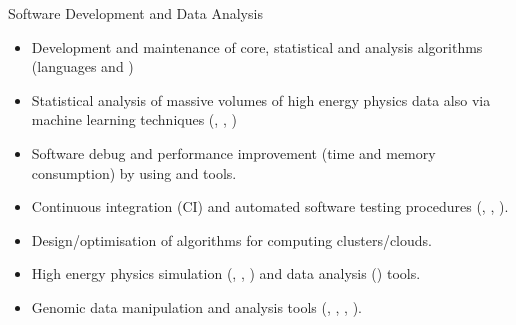\begin{cvskills}
\cvskill
{Software Development and Data Analysis}%
{
\begin{minipage}{0.49\textwidth}
\vspace{0.3em}
\begin{itemize}[labelwidth=\the\widest,align=right,leftmargin=!,labelsep=1pt,noitemsep]
\item[\custItem] Development and maintenance of core, statistical and analysis
algorithms (languages \textsc{\color{awesome}{C/C++}} and 
\textsc{\color{awesome}{Python}})
\item[\custItem] Statistical analysis of massive volumes of high energy physics
data also via machine learning techniques (\textsc{\color{awesome}{TMVA}},
\textsc{\color{awesome}{BDT}}, \textsc{\color{awesome}{TensorFlow}})
\item[\custItem] Software debug and performance improvement (time and memory
consumption) by using \textsc{\color{awesome}{gdb}} and
\textsc{\color{awesome}{Valgrind}} tools.
\end{itemize}
\end{minipage}
\hfill
\begin{minipage}{0.49\textwidth}
\vspace{0.3em}
\begin{itemize}[labelwidth=\the\widest,align=right,leftmargin=!,labelsep=1pt,noitemsep]
\item[\custItem] Continuous integration (CI) and automated software testing procedures
(\textsc{\color{awesome}{Bamboo}}, \textsc{\color{awesome}{Jenkins}},
\textsc{\color{awesome}{Gitlab}}).
\item[\custItem] Design/optimisation of algorithms for computing
clusters/clouds.
\item[\custItem] High energy physics simulation
(\textsc{\color{awesome}{Powheg}}, \textsc{\color{awesome}{Pythia}},
\textsc{\color{awesome}{Madgraph}}) and data analysis
(\textsc{\color{awesome}{ROOT}}) tools.
\item[\custItem] Genomic data manipulation and analysis tools
(\textsc{\color{awesome}{Samtools}}, \textsc{\color{awesome}{Vcftools}},
\textsc{\color{awesome}{Bwa-mem}}, \textsc{\color{awesome}{GATK}}).
\end{itemize}
\end{minipage}
}


\end{cvskills}
